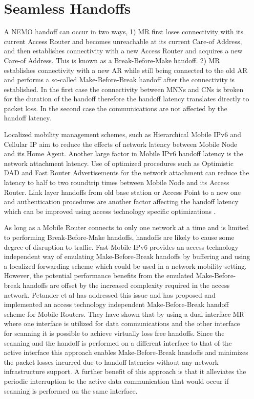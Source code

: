 \section{Seamless Handoffs}

A NEMO handoff can occur in two ways, 1) MR first loses connectivity with its
current Access Router and becomes unreachable at its current Care-of Address, and then
establishes connectivity with a new Access Router and acquires a new Care-of Address. This is known as a Break-Before-Make handoff. 2) MR establishes connectivity with a new AR
while still being connected to the old AR and performs a so-called
Make-Before-Break handoff after the connectivity is established. In the first
case the connectivity between MNNs and CNs is broken for the duration of the
handoff therefore the handoff latency translates directly to packet loss. In
the second case the communications are not affected by the handoff latency.

Localized mobility management schemes, such as Hierarchical Mobile IPv6 \cite{30}
and Cellular IP \cite{32} aim to reduce the effects of network latency between
Mobile Node and its Home Agent. Another large factor in Mobile IPv6 handoff
latency is the network attachment latency. Use of optimized procedures such as
Optimistic DAD \cite{33} and Fast Router Advertisements \cite{34} for the network
attachment can reduce the latency to half to two roundtrip times between
Mobile Node and its Access Router. Link layer handoffs from old base station or
Access Point to a new one and authentication procedures are another factor
affecting the handoff latency which can be improved using access technology
specific optimizations \cite{35}.

As long as a Mobile Router connects to only one network at a time and is limited
to performing Break-Before-Make handoffs, handoffs are likely to cause some
degree of disruption to traffic. Fast Mobile IPv6 \cite{36} provides an access
technology independent way of emulating Make-Before-Break handoffs by
buffering and using a localized forwarding scheme which could be used in a
network mobility setting. However, the potential performance benefits from the
emulated Make-Before-break handoffs are offset by the increased complexity
required in the access network. Petander et al \cite{37} has addressed this issue and
has proposed and implemented an access technology independent
Make-Before-Break handoff scheme for Mobile Routers. They have shown that by
using a dual interface MR where one interface is utilized for data
communications and the other interface for scanning it is possible to achieve
virtually loss free handoffs. Since the scanning and the handoff is performed
on a different interface to that of the active interface this approach enables
Make-Before-Break handoffs and minimizes the packet losses incurred due to
handoff latencies without any network infrastructure support. A further
benefit of this approach is that it alleviates the periodic interruption to
the active data communication that would occur if scanning is performed on the
same interface.

